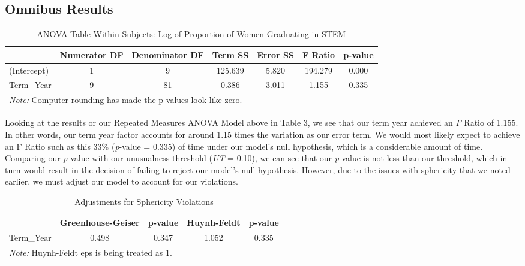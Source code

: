 \documentclass[]{article}
\begin{document}
\subsection{Omnibus Results}\label{omnibus-results}

\begin{table}[H]

\caption{\label{tab:univariate Results}ANOVA Table Within-Subjects: Log of Proportion of Women Graduating in STEM}
\centering
\fontsize{12}{14}\selectfont
\begin{tabular}[t]{l|c|c|c|c|c|c}
\hline
  & Numerator DF & Denominator DF & Term SS & Error SS & F Ratio & p-value\\
\hline
(Intercept) & 1 & 9 & 125.639 & 5.820 & 194.279 & 0.000\\
\hline
Term\_Year & 9 & 81 & 0.386 & 3.011 & 1.155 & 0.335\\
\hline
\multicolumn{7}{l}{\textit{Note: } Computer rounding has made the p-values look like zero.}\\
\end{tabular}
\end{table}

Looking at the results or our Repeated Measures ANOVA Model above in
Table 3, we see that our term year achieved an \emph{F} Ratio of 1.155.
In other words, our term year factor accounts for around 1.15 times the
variation as our error term. We would most likely expect to achieve an F
Ratio such as this 33\% (\emph{p}-value = 0.335) of time under our
model's null hypothesis, which is a considerable amount of time.
Comparing our \emph{p}-value with our unusualness threshold (\emph{UT} =
0.10), we can see that our \emph{p}-value is not less than our
threshold, which in turn would result in the decision of failing to
reject our model's null hypothesis. However, due to the issues with
sphericity that we noted earlier, we must adjust our model to account
for our violations.

\begin{table}[H]

\caption{\label{tab:sphericityAdjustments}Adjustments for Sphericity Violations}
\centering
\fontsize{12}{14}\selectfont
\begin{tabular}[t]{l|c|c|c|c}
\hline
  & Greenhouse-Geiser & p-value & Huynh-Feldt & p-value\\
\hline
Term\_Year & 0.498 & 0.347 & 1.052 & 0.335\\
\hline
\multicolumn{5}{l}{\textit{Note: } Huynh-Feldt eps is being treated as 1.}\\
\end{tabular}
\end{table}
\end{document}
